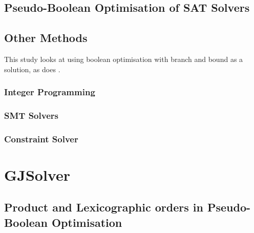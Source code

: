 
\subsection{Pseudo-Boolean Optimisation of SAT Solvers}



\subsection{Other Methods}
This \cite{Stuckenholz2007} study looks at using boolean optimisation with branch and bound as a solution, as does \cite{Jenson2010a}.


\subsubsection{Integer Programming}
\subsubsection{SMT Solvers}
\subsubsection{Constraint Solver}



\section{GJSolver}

\subsection{Product and Lexicographic orders in Pseudo-Boolean Optimisation}

